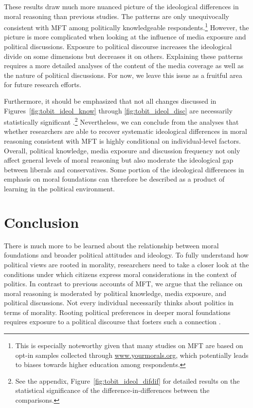 \documentclass[12pt]{article}
\begin{document}
These results draw much more nuanced picture of the ideological differences in moral reasoning than previous studies. The patterns are only unequivocally consistent with MFT among politically knowledgeable respondents.\footnote{This is especially noteworthy given that many studies on MFT are based on opt-in samples collected through \url{www.yourmorals.org}, which potentially leads to biases towards higher education among respondents.} However, the picture is more complicated when looking at the influence of media exposure and political discussions. Exposure to political discourse increases the ideological divide on some dimensions but decreases it on others. Explaining these patterns requires a more detailed analyses of the content of the media coverage as well as the nature of political discussions. For now, we leave this issue as a fruitful area for future research efforts.

Furthermore, it should be emphasized that not all changes discussed in Figures~\ref{fig:tobit_ideol_know} through \ref{fig:tobit_ideol_disc} are necessarily statistically significant \citep[c.f.][]{gelman2006difference}.\footnote{See the appendix, Figure~\ref{fig:tobit_ideol_difdif} for detailed results on the statistical significance of the difference-in-differences between the comparisons.} Nevertheless, we can conclude from the analyses that whether researchers are able to recover systematic ideological differences in moral reasoning consistent with MFT is highly conditional on individual-level factors. Overall, political knowledge, media exposure and discussion frequency not only affect general levels of moral reasoning but also moderate the ideological gap between liberals and conservatives. Some portion of the ideological differences in emphasis on moral foundations can therefore be described as a product of learning in the political environment.


\section{Conclusion}

There is much more to be learned about the relationship between moral foundations and broader political attitudes and ideology. To fully understand how political views are rooted in morality, researchers need to take a closer look at the conditions under which citizens express moral considerations in the context of politics. In contrast to previous accounts of MFT, we argue that the reliance on moral reasoning is moderated by political knowledge, media exposure, and political discussions. Not every individual necessarily thinks about politics in terms of morality. Rooting political preferences in deeper moral foundations requires exposure to a political discourse that fosters such a connection \citep[c.f.][]{clifford2015concerns}.
\end{document}
